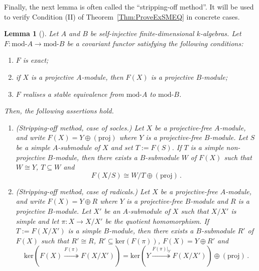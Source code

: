 \documentclass[12pt,a4paper]{amsart}
\theoremstyle{plain}\newtheorem{Theorem}{Theorem}[section]
\theoremstyle{plain}\newtheorem{Conjecture}[Theorem]{Conjecture}
\theoremstyle{plain}\newtheorem{Corollary}[Theorem]{Corollary}
\theoremstyle{plain}\newtheorem{Lemma}[Theorem]{Lemma}
\theoremstyle{plain}\newtheorem{Proposition}[Theorem]{Proposition}
\theoremstyle{definition}\newtheorem{Definition}[Theorem]{Definition}
\theoremstyle{definition}\newtheorem{Example}[Theorem]{Example}
\theoremstyle{definition}\newtheorem{Examples}[Theorem]{Examples}
\theoremstyle{definition}\newtheorem{Remark}[Theorem]{Remark}
\theoremstyle{definition}\newtheorem{Question}[Theorem]{Question}
\theoremstyle{definition}\newtheorem{Notation}[Theorem]{Notation}
\theoremstyle{definition}\newtheorem{Hypothesis}[Theorem]{Hypothesis}
\theoremstyle{definition}\newtheorem{Assumption}[Theorem]{Assumption}
\theoremstyle{definition}\newtheorem{Strategy}[Theorem]{Strategy}
\theoremstyle{definition}\newtheorem{Contents}[Theorem]{Contents}
\theoremstyle{definition}\newtheorem{Computations}[Theorem]{Computations}
\theoremstyle{definition}\newtheorem{Equivalences}[Theorem]{Equivalences}
\theoremstyle{definition}\newtheorem{Notation/Definition}[Theorem]{Notation/Definition}
\theoremstyle{definition}\newtheorem{noth}[Theorem]{}
\theoremstyle{plain}\newtheorem{Step}[Theorem]{Step}
\def\rad{\mathrm{rad}}
\def\ker{\mathrm{ker}} \def\tenkT{\otimes_{kT}} \def\Id{\mathrm{Id}}
\def\mod{\mathrm{mod}} \def\rad{\mathrm{rad}} \def\tenOP{\otimes_{\mathcal{O}P}}
\begin{document}
Finally, the next lemma is often called the ``stripping-off method''. It will be used to verify Condition (II) of Theorem~\ref{Thm:ProveExSMEQ}
in concrete cases. 



\begin{Lemma}[{\cite[Lemma A.1]{KMN11}}]\label{StrippingOffMethod}
Let $A$ and $B$ be self-injective finite-dimensional $k$-algebras. 
Let $F: \mod{\text{-}}A\longrightarrow \mod{\text{-}}B$ be a covariant functor satisfying the following conditions:
 \begin{enumerate}
  \renewcommand{\labelenumi}{\rm{(C\arabic{enumi})}}
   \item $F$ is exact;
   \item if $X$ is a projective $A$-module, then $F(X)$ is a 
    projective $B$-module;
   \item $F$ realises a stable equivalence from
    $\mod{\text{-}}A$ to $\mod{\text{-}}B$.
 \end{enumerate}
Then, the following assertions hold.
\begin{enumerate}

 \item[\rm(a)]
{\sf (Stripping-off method, case of socles.)} 
  Let $X$ be a projective-free $A$-module, and write
  $F(X) = Y \oplus ({\mathrm{proj}})$ where $Y$ is a projective-free $B$-module. 
  Let $S$ be a simple $A$-submodule of $X$ and set $T := F(S)$. 
  If $T$ is a simple non-projective $B$-module, then there exists a $B$-submodule $W$ of $F(X)$
  such that $W\cong Y$,  $T\subseteq W$ and 
  \[
   F(X/S)\cong W/T \oplus ({\mathrm{proj}})\,.
   \]
 \item[\rm(b)] 
{\sf (Stripping-off method, case of radicals.)} 
  Let $X$ be a projective-free $A$-module, and write $F(X) = Y \oplus R$ where $Y$ is  a projective-free $B$-module and $R$ is a projective $B$-module. 
  Let $X'$ be an $A$-submodule of $X$ such that $X/X'$ is simple and 
  let ${\pi:X\longrightarrow X/X'}$ be the quotient homomorphism.
  If $T:= F(X/X')$ is a simple $B$-module,
  then there exists a $B$-submodule $R'$ of $F(X)$ such that $R'\cong R$, $R'\subseteq \ker(F(\pi))$, $F(X) = Y \oplus R'$
  and 
  $${\mathrm{ker}}\left(F(X) \overset{F(\pi)}{\twoheadrightarrow} F(X/X')\right) =  
{\mathrm{ker}}\left(Y \overset{F(\pi)|_{Y}}{\twoheadrightarrow }F(X/X')   \right) \oplus   ({\mathrm{proj}})\,.  $$
\end{enumerate}
\end{Lemma}
\end{document}
